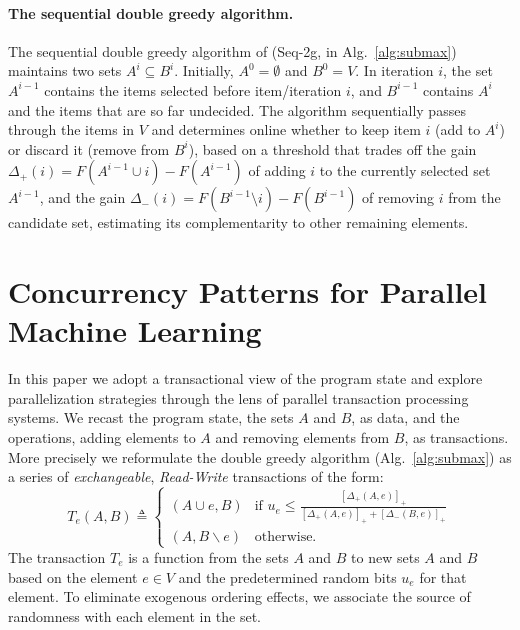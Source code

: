 \documentclass{article} %
\newcommand{\seqalg}{Seq-2g}
\newcommand{\algref}[1]{Alg.~\ref{#1}}
\newcommand{\hinge}[1]{\left[  #1 \right]_+}
\newcommand{\union}{\cup}
\begin{document}
\paragraph{The sequential double greedy algorithm.}
The sequential double greedy algorithm of \citet{buchbinder2012} (\seqalg{}, in \algref{alg:submax}) maintains two sets $A^i \subseteq B^i$.
Initially, $A^0 = \emptyset$ and $B^0 = V$.
In iteration $i$, the set $A^{i-1}$ contains the items selected before item/iteration $i$, and $B^{i-1}$ contains $A^i$ and the items that are so far undecided.
The algorithm sequentially passes through the items in $V$ and determines online whether to keep item $i$ (add to $A^i$) or discard it (remove from $B^i$), based on a threshold that trades off the gain $\Delta_+(i) = F(A^{i-1} \union i) - F(A^{i-1})$ of adding $i$ to the currently selected set $A^{i-1}$, and the gain $\Delta_-(i) = F(B^{i-1}\setminus i) - F(B^{i-1})$ of removing $i$ from the candidate set, estimating its complementarity to other remaining elements.









\section{Concurrency Patterns for Parallel Machine Learning \label{sec:concurrencycontrol}}

In this paper we adopt a transactional view of the program state and explore parallelization strategies through the lens of parallel transaction processing systems.
We recast the program state, the sets $A$ and $B$, as data, and the operations, adding elements to $A$ and removing elements from $B$, as transactions.
More precisely we reformulate the double greedy algorithm (\algref{alg:submax}) as a series of \emph{exchangeable}, \emph{Read-Write} transactions of the form:
\begin{equation}
T_e(A,B) \triangleq
\begin{cases}
   (A \union e, B) & \text{if } u_e \leq \frac{\hinge{\Delta_+(A,e)}}{ \hinge{\Delta_+(A,e)} + \hinge{\Delta_-(B,e)}}  \\
   (A, B \backslash e) & \text{otherwise. }
  \end{cases}
  \label{eqn:greedytransaction}
\end{equation}
The transaction $T_e$ is a function from the sets $A$ and $B$ to new sets $A$ and $B$ based on the element $e \in V$ and the predetermined random bits $u_e$ for that element.
To eliminate exogenous ordering effects, we associate the source of randomness with each element in the set.
\end{document}
